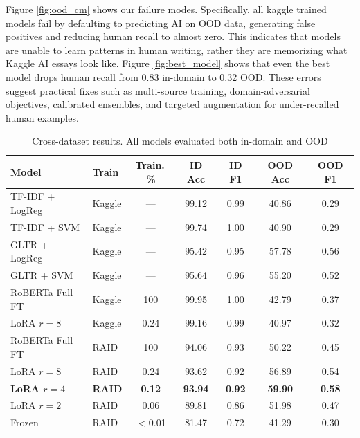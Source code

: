 \documentclass{article}
\begin{document}
Figure \ref{fig:ood_cm} shows our failure modes. Specifically, all kaggle trained models fail by defaulting to predicting AI on OOD data, generating false positives and reducing human recall to almost zero. This indicates that models are unable to learn patterns in human writing, rather they are memorizing what Kaggle AI essays look like. Figure \ref{fig:best_model} shows that even the best model drops human recall from 0.83 in-domain
to 0.32 OOD.
These errors suggest practical fixes such as multi-source training, domain-adversarial objectives, calibrated ensembles, and targeted augmentation for under-recalled human examples.
\begin{table}[H]
    \centering
    \caption{Cross-dataset results. All models evaluated both in-domain
        and OOD}
    \label{tab:summary}
    \footnotesize
    \begin{tabular}{@{}llccccc@{}}
        \toprule
        Model                 & Train         & Train.\,\%    & ID Acc         & ID F1         & OOD Acc        & OOD F1        \\
        \midrule
        TF-IDF + LogReg       & Kaggle        & ---           & 99.12          & 0.99          & 40.86          & 0.29          \\
        TF-IDF + SVM          & Kaggle        & ---           & 99.74          & 1.00          & 40.90          & 0.29          \\
        GLTR + LogReg         & Kaggle        & ---           & 95.42          & 0.95          & 57.78          & 0.56          \\
        GLTR + SVM            & Kaggle        & ---           & 95.64          & 0.96          & 55.20          & 0.52          \\
        \midrule
        RoBERTa Full FT       & Kaggle        & 100           & 99.95          & 1.00          & 42.79          & 0.37          \\
        LoRA $r{=}8$          & Kaggle        & 0.24          & 99.16          & 0.99          & 40.97          & 0.32          \\
        \midrule
        RoBERTa Full FT       & RAID          & 100           & 94.06          & 0.93          & 50.22          & 0.45          \\
        LoRA $r{=}8$          & RAID          & 0.24          & 93.62          & 0.92          & 56.89          & 0.54          \\
        \textbf{LoRA $r{=}4$} & \textbf{RAID} & \textbf{0.12} & \textbf{93.94} & \textbf{0.92} & \textbf{59.90} & \textbf{0.58} \\
        LoRA $r{=}2$          & RAID          & 0.06          & 89.81          & 0.86          & 51.98          & 0.47          \\
        Frozen                & RAID          & $<$0.01       & 81.47          & 0.72          & 41.29          & 0.30          \\
        \bottomrule
    \end{tabular}
\end{table}
\end{document}
